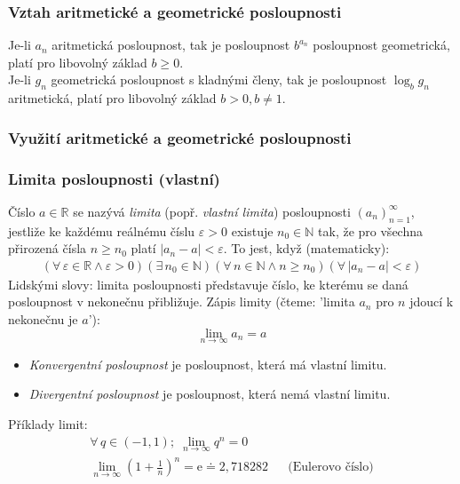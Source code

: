 \documentclass[12pt]{article}
\newcommand{\euler}{\mathrm{e}} %
\begin{document}
\subsubsection{Vztah aritmetické a geometrické posloupnosti}
Je-li $a_n$ aritmetická posloupnost, tak je posloupnost $b^{a_n}$ posloupnost geometrická, platí pro libovolný základ $b \geq 0$.\\
Je-li $g_n$ geometrická posloupnost s kladnými členy, tak je posloupnost $\log_b g_n $aritmetická, platí pro libovolný základ $b>0, b \neq 1$.
\subsubsection{Využití aritmetické a geometrické posloupnosti}
\subsubsection{Limita posloupnosti (vlastní)}
\label{sec:posl_limita}
Číslo $a \in \mathbb{R}$  se nazývá \emph{limita} (popř. \emph{vlastní limita}) posloupnosti $( a_n )_{n=1}^{\infty}$, jestliže ke každému reálnému číslu $\varepsilon > 0$ existuje $n_0 \in \mathbb{N}$ tak, že pro všechna přirozená čísla $n \geq n_0$ platí $|a_n - a| < \varepsilon$. To jest, když (matematicky):
\begin{align}
( \forall \, \varepsilon \in \mathbb{R} \land \varepsilon >0)(\exists \, n_0 \in \mathbb{N}) ( \forall \, n \in \mathbb{N} \land n \geq n_0)( \forall \, |a_n -a| < \varepsilon)
\end{align}
Lidskými slovy: limita posloupnosti představuje číslo, ke kterému se daná posloupnost v nekonečnu přibližuje.
Zápis limity (čteme: 'limita $a_n$ pro $n$ jdoucí k nekonečnu je $a$'):
\begin{equation}
\lim_{n \to \infty} a_n = a
\end{equation}
\begin{itemize}
\item \emph{Konvergentní posloupnost} je posloupnost, která má vlastní limitu.
\item \emph{Divergentní posloupnost} je posloupnost, která nemá vlastní limitu.
\end{itemize}
Příklady limit:
\begin{align}
\forall \, q \in (-1, 1); \; \lim_{n \to \infty} q^n = 0\\
\lim_{n \to \infty} \left( 1 + \frac{1}{n} \right)^n = \euler \doteq  2,718282 && \text{(Eulerovo číslo)}
\end{align}
\end{document}
